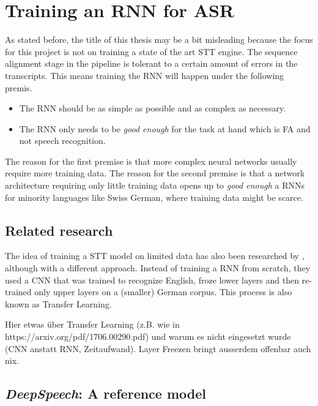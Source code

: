 \section{Training an \ac{RNN} for \ac{ASR}}\label{ds}
As stated before, the title of this thesis may be a bit misleading because the focus for this project is not on training a state of the art \ac{STT} engine. The sequence alignment stage in the pipeline is tolerant to a certain amount of errors in the transcripts. This means training the \ac{RNN} will happen under the following premis.

\begin{itemize}
	\item The \ac{RNN} should be as simple as possible and as complex as necessary.
	\item The \ac{RNN} only needs to be \textit{good enough} for the task at hand which is \ac{FA} and not speech recognition.	
\end{itemize}

The reason for the first premise is that more complex neural networks usually require more training data. The reason for the second premise is that a network architecture requiring only little training data opens up to \textit{good enough} a \ac{RNN}s for minority languages like Swiss German, where training data might be scarce.

\subsection{Related research}

The idea of training a \ac{STT} model on limited data has also been researched by \cite{budget}, although with a different approach. Instead of training a \ac{RNN} from scratch, they used a \ac{CNN} that was trained to recognize English, froze lower layers and then re-trained only upper layers on a (smaller) German corpus. This process is also known as Transfer Learning.

Hier etwas über Transfer Learning (z.B. wie in https://arxiv.org/pdf/1706.00290.pdf) und warum es nicht eingesetzt wurde (CNN anstatt RNN, Zeitaufwand). Layer Freezen bringt ausserdem offenbar auch nix. \parencite{budget}

\subsection{\textit{DeepSpeech}: A reference model}

